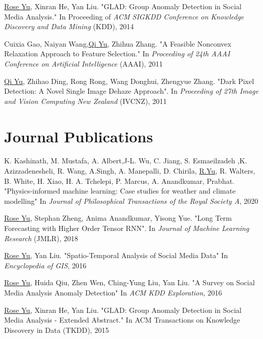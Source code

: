 \documentclass[margin,line]{res}
\begin{document}
\begin{resume}
\begin{enumerate}[label={[C\arabic*]}]
\item \underline{Rose Yu}, Xinran He, Yan Liu. "GLAD: Group Anomaly Detection in Social Media Analysis." In Proceeding of  \textit{ACM SIGKDD Conference on Knowledge Discovery and Data Mining} (KDD), 2014

\item Cuixia Gao, Naiyan Wang,\underline{Qi Yu}, Zhihua Zhang. "A Feasible Nonconvex Relaxation Approach to Feature Selection." In \textit{Proceeding of 24th AAAI Conference on Artificial Intelligence} (AAAI), 2011 

\item  \underline{Qi Yu}, Zhihao Ding, Rong Rong, Wang Donghui, Zhengyue Zhang. "Dark Pixel Detection: A Novel Single Image Dehaze Approach". In \textit{Proceeding of 27th Image and Vision Computing New Zealand }(IVCNZ), 2011  
\end{enumerate}

 
\section{\sc Journal Publications}
\begin{enumerate}[label={[J\arabic*]}]
\item K. Kashinath, M. Mustafa, A. Albert,J-L. Wu, C. Jiang, S. Esmaeilzadeh ,K. Azizzadenesheli, R. Wang, A.Singh, A. Manepalli, D. Chirila, \underline{R.Yu}, R. Walters, B. White, H. Xiao, H. A. Tchelepi, P. Marcus, A. Anandkumar,  Prabhat. "Physics-informed machine learning: Case studies for weather and climate modelling" In \textit{Journal of Philosophical Transactions of the Royal Society  A}, 2020

\item \underline{Rose Yu}, Stephan Zheng, Anima Anandkumar, Yisong Yue. "Long Term Forecasting with Higher Order Tensor RNN". In  \textit{ Journal of Machine Learning Research} (JMLR), 2018



\item \underline{Rose Yu},  Yan Liu.  "Spatio-Temporal Analysis of Social Media Data"  In \textit{Encyclopedia of GIS}, 2016

\item \underline{Rose Yu}, Huida Qiu, Zhen Wen, Ching-Yung Liu,  Yan Liu. "A Survey on Social Media Analysis  Anomaly Detection" In \textit{ACM KDD Exploration},  2016

\item \underline{Rose Yu}, Xinran He, Yan Liu. "GLAD: Group Anomaly Detection in Social Media Analysis - Extended Abstract." In \textit{}ACM Transactions on Knowledge Discovery in Data  (TKDD), 2015
\end{enumerate}


\end{resume}
\end{document}

